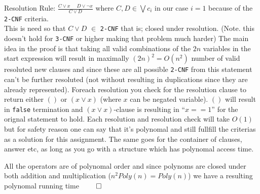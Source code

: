 \documentclass[a4paper,twoside=false,abstract=false,numbers=noenddot,
titlepage=false,headings=small,parskip=half,version=last]{scrartcl}
\begin{document}
Resolution Rule: $\frac{C \vee x \ \ \ \ \ \ D \vee \neg x}{C \vee D}$ where $C,D \in \bigvee{c_{i}}$ in our case $i=1$ because of the \verb+2-CNF+ criteria. \\
This is need so that $C \vee D$ $\in$ \verb+2-CNF+ that is; closed under resolution. (Note. this doesn't hold for \verb+3-CNF+ or higher making that problem much harder)
The main idea in the proof is that taking all valid combinations of the $2n$ variables in the start expression will result in maximally $(2n)^2=O(n^2)$ number of valid resoluted new clauses 
and since these are all possible \verb+2-CNF+ from this statement can't be further resoluted (not without resulting in duplications since they are already represented).
Foreach resolution you check for the resolution clause to return either $()$ or $(x \vee x)$ (where $x$ can be negated variable). 
$()$ will result in \verb+false+ termination and $(x \vee x)$-clause is resulting in ``$x==1$'' for the orignal statement to hold. 
Each resolution and resolution check will take $O(1)$ but for safety reason one can say that it's polynomal and still fullfill the criterias as a solution for this assignment.
The same goes for the container of clauses, answer etc, as long as you go with a structure which has polynomal access time.

All the operators are of polynomal order and since polynoms are closed under both addition and multiplication ($n^{2}Poly(n)=Poly(n)$) we have a resulting polynomal running time $\qed$
\end{document}
